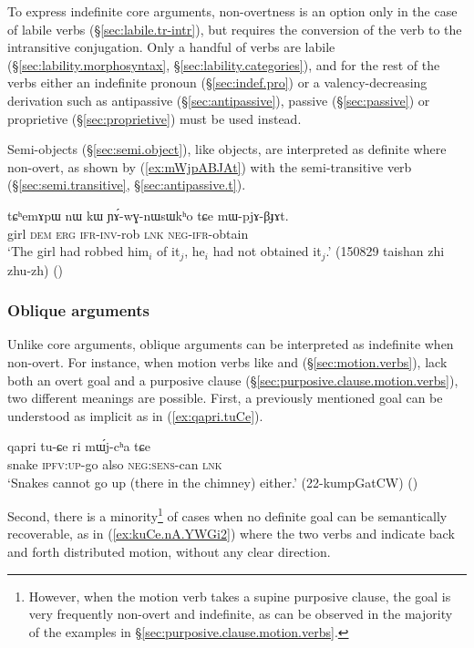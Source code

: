 To express indefinite core arguments, non-overtness is an option only in the case of labile verbs (§\ref{sec:labile.tr-intr}), but requires the conversion of the verb to the intransitive conjugation. Only a handful of verbs are labile (§\ref{sec:lability.morphosyntax}, §\ref{sec:lability.categories}), and for the rest of the verbs either an indefinite pronoun (§\ref{sec:indef.pro}) or a valency-decreasing derivation such as antipassive (§\ref{sec:antipassive}), passive (§\ref{sec:passive}) or proprietive (§\ref{sec:proprietive}) must be used instead.

Semi-objects (§\ref{sec:semi.object}), like objects, are interpreted as definite where non-overt, as shown by (\ref{ex:mWjpABJAt}) with the semi-transitive verb  (§\ref{sec:semi.transitive}, §\ref{sec:antipassive.t}).

\begin{exe}
\ex \label{ex:mWjpABJAt}
\gll tɕʰemɤpɯ nɯ kɯ ɲɤ́-wɣ-nɯsɯkʰo tɕe mɯ-pjɤ-βɟɤt. \\
girl \textsc{dem} \textsc{erg} \textsc{ifr}-\textsc{inv}-rob \textsc{lnk} \textsc{neg}-\textsc{ifr}-obtain \\
\glt `The girl had robbed him$_i$ of it$_j$, he$_i$ had not obtained it$_j$.' (150829 taishan zhi zhu-zh)
()
\end{exe}

\subsubsection{Oblique arguments}
Unlike core arguments, oblique arguments can be interpreted as indefinite when non-overt. For instance, when motion verbs like  and  (§\ref{sec:motion.verbs}), lack both an overt goal and a purposive clause (§\ref{sec:purposive.clause.motion.verbs}), two different meanings are possible. First, a previously mentioned goal can be understood as implicit as in (\ref{ex:qapri.tuCe}).

\begin{exe} 
\ex \label{ex:qapri.tuCe}
\gll qapri tu-ɕe ri mɯ́j-cʰa tɕe \\
snake \textsc{ipfv}:\textsc{up}-go also \textsc{neg}:\textsc{sens}-can \textsc{lnk} \\
\glt `Snakes cannot go up (there in the chimney) either.' (22-kumpGatCW)
()
\end{exe} 

Second, there is a minority\footnote{However, when the motion verb takes a supine purposive clause, the goal is very frequently non-overt and indefinite, as can be observed in the majority of the examples in §\ref{sec:purposive.clause.motion.verbs}.  } of cases when no definite goal can be semantically recoverable, as in (\ref{ex:kuCe.nA.YWGi2}) where the two verbs  and  indicate back and forth distributed motion, without any clear direction.

